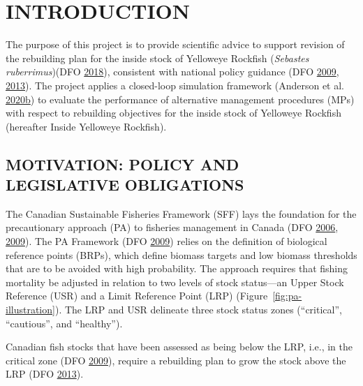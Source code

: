 \documentclass[11pt]{book}
\begin{document}
\frontmatter

\clearpage

\hypertarget{sec:introduction}{%
\section{INTRODUCTION}\label{sec:introduction}}

The purpose of this project is to provide scientific advice to support revision of the rebuilding plan for the inside stock of Yelloweye Rockfish (\emph{Sebastes ruberrimus})(DFO \protect\hyperlink{ref-ifmp2018}{2018}), consistent with national policy guidance (DFO \protect\hyperlink{ref-dfo2009}{2009}, \protect\hyperlink{ref-dfo2013}{2013}). The project applies a closed-loop simulation framework (Anderson et al. \protect\hyperlink{ref-anderson2020gfmp}{2020}\protect\hyperlink{ref-anderson2020gfmp}{b}) to evaluate the performance of alternative management procedures (MPs) with respect to rebuilding objectives for the inside stock of Yelloweye Rockfish (hereafter Inside Yelloweye Rockfish).

\hypertarget{sec:introduction-motivation}{%
\subsection{MOTIVATION: POLICY AND LEGISLATIVE OBLIGATIONS}\label{sec:introduction-motivation}}

The Canadian Sustainable Fisheries Framework (SFF) lays the foundation for the precautionary approach (PA) to fisheries management in Canada (DFO \protect\hyperlink{ref-dfo2006}{2006}, \protect\hyperlink{ref-dfo2009}{2009}). The PA Framework (DFO \protect\hyperlink{ref-dfo2009}{2009}) relies on the definition of biological reference points (BRPs), which define biomass targets and low biomass thresholds that are to be avoided with high probability. The approach requires that fishing mortality be adjusted in relation to two levels of stock status---an Upper Stock Reference (USR) and a Limit Reference Point (LRP) (Figure~\ref{fig:pa-illustration}). The LRP and USR delineate three stock status zones (``critical'', ``cautious'', and ``healthy'').

Canadian fish stocks that have been assessed as being below the LRP, i.e., in the critical zone (DFO \protect\hyperlink{ref-dfo2009}{2009}), require a rebuilding plan to grow the stock above the LRP (DFO \protect\hyperlink{ref-dfo2013}{2013}).
\end{document}
